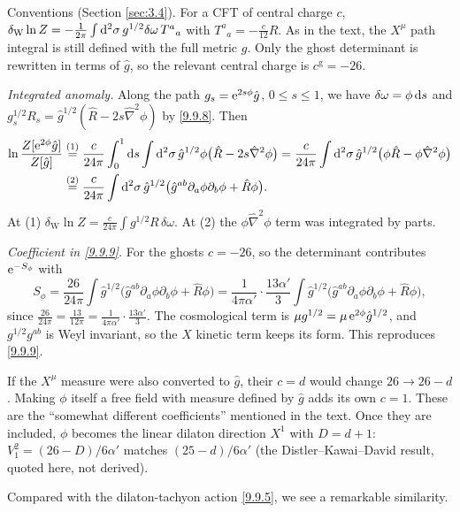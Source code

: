 \begin{tcolorbox}[breakable]
	\begin{remark}
		Conventions (Section \ref{sec:3.4}). For a CFT of central charge $c$, $\delta_{\mathrm W}\ln Z=-\frac{1}{2\pi}\int\mathrm{d}^2\sigma\,g^{1/2}\delta\omega\,T^a{}_a$ with $T^a{}_a=-\frac{c}{12}R$. As in the text, the $X^\mu$ path integral is still defined with the full metric $g$. Only the ghost determinant is rewritten in terms of $\hat g$, so the relevant central charge is $c^{\mathrm g}=-26$.

		\emph{Integrated anomaly.} Along the path $g_s=\mathrm{e}^{2s\phi}\hat g$, $0\le s\le1$, we have $\delta\omega=\phi\,\mathrm{d} s$ and $g_s^{1/2}R_s=\hat g^{1/2}(\hat R-2s\hat\nabla^2\phi)$ by \eqref{9.9.8}. Then
		\begin{align*}
			\ln\frac{Z[\mathrm{e}^{2\phi}\hat g]}{Z[\hat g]}&\overset{(1)}{=}\frac{c}{24\pi}\int_0^1\mathrm{d} s\int\mathrm{d}^2\sigma\,\hat g^{1/2}\phi\bigl(\hat R-2s\hat\nabla^2\phi\bigr)
			=\frac{c}{24\pi}\int\mathrm{d}^2\sigma\,\hat g^{1/2}\bigl(\phi\hat R-\phi\hat\nabla^2\phi\bigr)\\
			&\overset{(2)}{=}\frac{c}{24\pi}\int\mathrm{d}^2\sigma\,\hat g^{1/2}\bigl(\hat g^{ab}\partial_a\phi\partial_b\phi+\hat R\phi\bigr) .
		\end{align*}
		At (1) $\delta_{\mathrm W}\ln Z=\frac{c}{24\pi}\int g^{1/2}R\,\delta\omega$. At (2) the $\phi\hat\nabla^2\phi$ term was integrated by parts.

		\emph{Coefficient in \eqref{9.9.9}.} For the ghosts $c=-26$, so the determinant contributes $\mathrm{e}^{-S_\phi}$ with
		\begin{equation*}
			S_\phi=\frac{26}{24\pi}\int\hat g^{1/2}\bigl(\hat g^{ab}\partial_a\phi\partial_b\phi+\hat R\phi\bigr)=\frac{1}{4\pi\alpha'}\cdot\frac{13\alpha'}{3}\int\hat g^{1/2}\bigl(\hat g^{ab}\partial_a\phi\partial_b\phi+\hat R\phi\bigr),
		\end{equation*}
		since $\frac{26}{24\pi}=\frac{13}{12\pi}=\frac{1}{4\pi\alpha'}\cdot\frac{13\alpha'}{3}$. The cosmological term is $\mu g^{1/2}=\mu\,\mathrm{e}^{2\phi}\hat g^{1/2}$, and $g^{1/2}g^{ab}$ is Weyl invariant, so the $X$ kinetic term keeps its form. This reproduces \eqref{9.9.9}.

		If the $X^\mu$ measure were also converted to $\hat g$, their $c=d$ would change $26\to26-d$. Making $\phi$ itself a free field with measure defined by $\hat g$ adds its own $c=1$. These are the ``somewhat different coefficients'' mentioned in the text. Once they are included, $\phi$ becomes the linear dilaton direction $X^1$ with $D=d+1$: $V_1^2=(26-D)/6\alpha'$ matches $(25-d)/6\alpha'$ (the Distler--Kawai--David result, quoted here, not derived).
	\end{remark}
\end{tcolorbox} Compared with the dilaton-tachyon action \eqref{9.9.5}, we see a remarkable similarity. 
